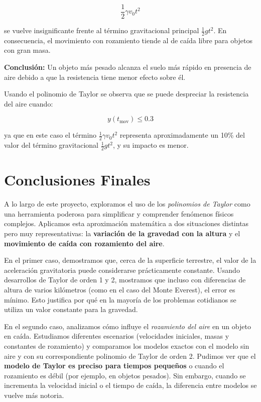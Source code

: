 \documentclass{article}
\begin{document}
\[
\frac{1}{2} \gamma v_0 t^2
\]

se vuelve insignificante frente al término gravitacional principal $\frac{1}{2}gt^2$. En consecuencia, el movimiento con rozamiento tiende al de caída libre para objetos con gran masa.

\medskip

\textbf{Conclusión:} Un objeto más pesado alcanza el suelo más rápido en presencia de aire debido a que la resistencia tiene menor efecto sobre él.

\medskip

Usando el polinomio de Taylor se observa que se puede despreciar la resistencia del aire cuando:

\[
y(t_{\text{mov}}) \leq 0.3
\]

ya que en este caso el término $\frac{1}{2}\gamma v_0 t^2$ representa aproximadamente un 10\% del valor del término gravitacional $\frac{1}{2}gt^2$, y su impacto es menor.





\section{Conclusiones Finales}

A lo largo de este proyecto, exploramos el uso de los \textit{polinomios de Taylor} como una herramienta poderosa para simplificar y comprender fenómenos físicos complejos. Aplicamos esta aproximación matemática a dos situaciones distintas pero muy representativas: la \textbf{variación de la gravedad con la altura} y el \textbf{movimiento de caída con rozamiento del aire}.

En el primer caso, demostramos que, cerca de la superficie terrestre, el valor de la aceleración gravitatoria puede considerarse prácticamente constante. Usando desarrollos de Taylor de orden 1 y 2, mostramos que incluso con diferencias de altura de varios kilómetros (como en el caso del Monte Everest), el error es mínimo. Esto justifica por qué en la mayoría de los problemas cotidianos se utiliza un valor constante para la gravedad.

En el segundo caso, analizamos cómo influye el \textit{rozamiento del aire} en un objeto en caída. Estudiamos diferentes escenarios (velocidades iniciales, masas y constantes de rozamiento) y comparamos los modelos exactos con el modelo sin aire y con su correspondiente polinomio de Taylor de orden 2. Pudimos ver que el \textbf{modelo de Taylor es preciso para tiempos pequeños} o cuando el rozamiento es débil (por ejemplo, en objetos pesados). Sin embargo, cuando se incrementa la velocidad inicial o el tiempo de caída, la diferencia entre modelos se vuelve más notoria.
\end{document}

